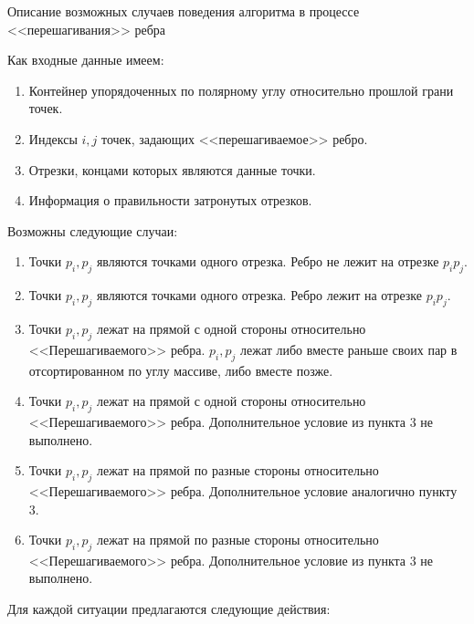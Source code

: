 \documentclass[letterpaper,12pt]{article}
\begin{document}
\begin{center}
Описание возможных случаев поведения алгоритма в процессе <<перешагивания>>
ребра
\end{center}
Как входные данные имеем: 
\begin{enumerate}
      \item Контейнер упорядоченных по полярному углу относительно
            прошлой грани точек.
      \item Индексы $i, j$ точек, задающих <<перешагиваемое>> ребро.
      \item Отрезки, концами которых являются данные точки.
      \item Информация о правильности затронутых отрезков.
\end{enumerate}
Возможны следующие случаи:
\begin{enumerate}
      \item Точки $p_i, p_j$ являются точками одного отрезка. Ребро не
            лежит на отрезке $p_i p_j$.
      \item Точки $p_i, p_j$ являются точками одного отрезка. Ребро
            лежит на отрезке $p_i p_j$.
      \item Точки $p_i, p_j$ лежат на прямой с одной стороны относительно
            <<Перешагиваемого>> ребра. $p_i, p_j$ лежат либо вместе
            раньше своих пар в отсортированном по углу массиве, либо
            вместе позже.
      \item Точки $p_i, p_j$ лежат на прямой с одной стороны относительно
            <<Перешагиваемого>> ребра. Дополнительное условие из пункта 3 
            не выполнено.
      \item Точки $p_i, p_j$ лежат на прямой по разные стороны 
            относительно <<Перешагиваемого>> ребра. Дополнительное
            условие аналогично пункту 3.
      \item Точки $p_i, p_j$ лежат на прямой по разные стороны 
            относительно <<Перешагиваемого>> ребра. Дополнительное условие 
            из пункта 3 не выполнено.
\end{enumerate}
Для каждой ситуации предлагаются следующие действия:
\end{document}

